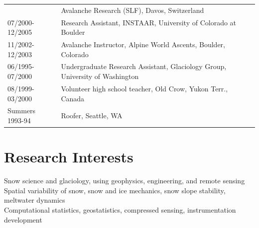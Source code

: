 \documentclass[11pt]{article}
\begin{document}
\begin{tabular}{ll}
& Avalanche Research (SLF), Davos, Switzerland \\ 
07/2000-12/2005 & Research Assistant, INSTAAR, University of Colorado at Boulder \\
11/2002-12/2003 & Avalanche Instructor, Alpine World Ascents, Boulder, Colorado \\
06/1995-07/2000 & Undergraduate Research Assistant, Glaciology Group, University of Washington \\
08/1999-03/2000 & Volunteer high school teacher, Old Crow, Yukon Terr., Canada \\
Summers 1993-94 & Roofer, Seattle, WA \\
\end{tabular}

\section*{Research Interests}
Snow science and glaciology, using geophysics, engineering, and remote sensing \\
Spatial variability of snow, snow and ice mechanics, snow slope stability, meltwater dynamics \\
Computational statistics, geostatistics, compressed sensing, instrumentation development \\
\end{document}
